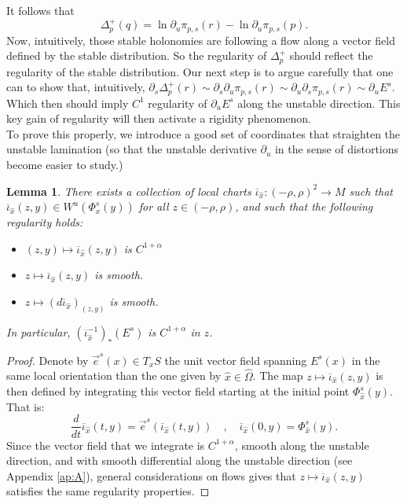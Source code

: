 \documentclass[a4paper]{article}
\newtheorem{lemma}[theorem]{Lemma}
\theoremstyle{definition}
\begin{document}
It follows that $$\Delta_p^+(q) = \ln \partial_u \pi_{p,s}(r) - \ln \partial_u \pi_{p,s}(p).$$
Now, intuitively, those stable holonomies are following a flow along a vector field defined by the stable distribution. So the regularity of $\Delta^+_p$ should reflect the regularity of the stable distribution. Our next step is to argue carefully that one can  to show that, intuitively, $\partial_s \Delta^+_p(r) \sim \partial_s \partial_u \pi_{p,s}(r) \sim \partial_u \partial_s \pi_{p,s}(r) \sim \partial_u E^s $. Which then should imply $C^1$ regularity of $\partial_u E^s$ along the unstable direction. This key gain of regularity will then activate a rigidity phenomenon. \\

To prove this properly, we introduce a good set of coordinates that straighten the unstable lamination (so that the unstable derivative $\partial_u$ in the sense of distortions become easier to study.)

\begin{lemma}
There exists a collection of local charts $\overline{\iota}_{\widehat{x}}:(-\rho,\rho)^2 \rightarrow M$ such that $\overline{\iota}_{\widehat{x}}(z,y) \in W^u(\Phi_x^s(y))$ for all $z \in (-\rho,\rho)$, and such that the following regularity holds:
\begin{itemize}
\item $(z,y) \mapsto \overline{\iota}_{\widehat{x}}(z,y) $ is $ C^{1+\alpha}$
\item $z \mapsto \overline{\iota}_{\widehat{x}}(z,y) $ is smooth.
\item $z \mapsto (d \overline{\iota}_{\widehat{x}})_{(z,y)}$ is smooth.
\end{itemize}
In particular, $(\overline{\iota}_{\widehat{x}}^{-1})_*(E^s)$ is $C^{1+\alpha}$ in $z$.
\end{lemma}

\begin{proof}
Denote by $\vec{e}^s(x) \in T_x S$ the unit vector field spanning $E^s(x)$ in the same local orientation than the one given by $\widehat{x} \in \widehat{\Omega}$. The map $z \mapsto \overline{\iota}_{\widehat{x}}(z,y)$ is then defined by integrating this vector field starting at the initial point $\Phi_{\widehat{x}}^s(y)$. That is:
$$ \frac{d}{dt} \overline{\iota}_{\widehat{x}}(t,y) = \vec{e}^s( \overline{\iota}_{\widehat{x}}(t,y) ) \quad , \quad \overline{\iota}_{\widehat{x}}(0,y) = \Phi_{\widehat{x}}^s(y). $$
Since the vector field that we integrate is $C^{1+\alpha}$, smooth along the unstable direction, and with smooth differential along the unstable direction (see Appendix \ref{ap:A}), general considerations on flows gives that $z \mapsto \overline{\iota}_{\widehat{x}}(z,y)$ satisfies the same regularity properties.
\end{proof}
\end{document}
